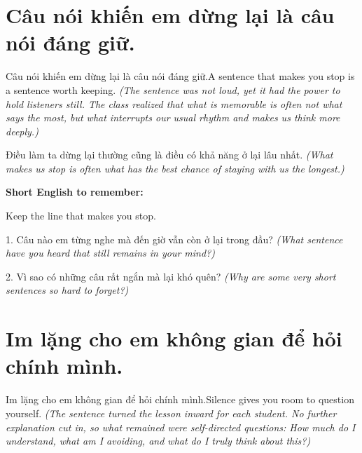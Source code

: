 \section{Câu nói khiến em dừng lại là câu nói đáng giữ.}
\begin{truyen}{Câu nói khiến em dừng lại là câu nói đáng giữ.}{A sentence that makes you stop is a sentence worth keeping.}
\textit{(The sentence was not loud, yet it had the power to hold listeners still. The class realized that what is memorable is often not what says the most, but what interrupts our usual rhythm and makes us think more deeply.)}
\end{truyen}

\begin{baihoc}
Điều làm ta dừng lại thường cũng là điều có khả năng ở lại lâu nhất.
\textit{(What makes us stop is often what has the best chance of staying with us the longest.)}
\end{baihoc}

\begin{ghinhoanh}
\textbf{Short English to remember:}

Keep the line that makes you stop.

\end{ghinhoanh}

\begin{tuhocnhanh}
1. Câu nào em từng nghe mà đến giờ vẫn còn ở lại trong đầu? \textit{(What sentence have you heard that still remains in your mind?)}

2. Vì sao có những câu rất ngắn mà lại khó quên? \textit{(Why are some very short sentences so hard to forget?)}
\end{tuhocnhanh}
\ngancach


\section{Im lặng cho em không gian để hỏi chính mình.}
\begin{truyen}{Im lặng cho em không gian để hỏi chính mình.}{Silence gives you room to question yourself.}
\textit{(The sentence turned the lesson inward for each student. No further explanation cut in, so what remained were self-directed questions: How much do I understand, what am I avoiding, and what do I truly think about this?)}
\end{truyen}

